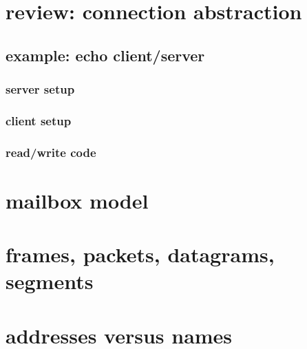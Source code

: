 \date{}
\title{}
\date{}

\begin{frame}
    \titlepage
\end{frame}



\section{review: connection abstraction}



\subsection{example: echo client/server}
\subsubsection{server setup}

\subsubsection{client setup}


\subsubsection{read/write code}


\section{mailbox model}


\section{frames, packets, datagrams, segments}



\section{addresses versus names}





